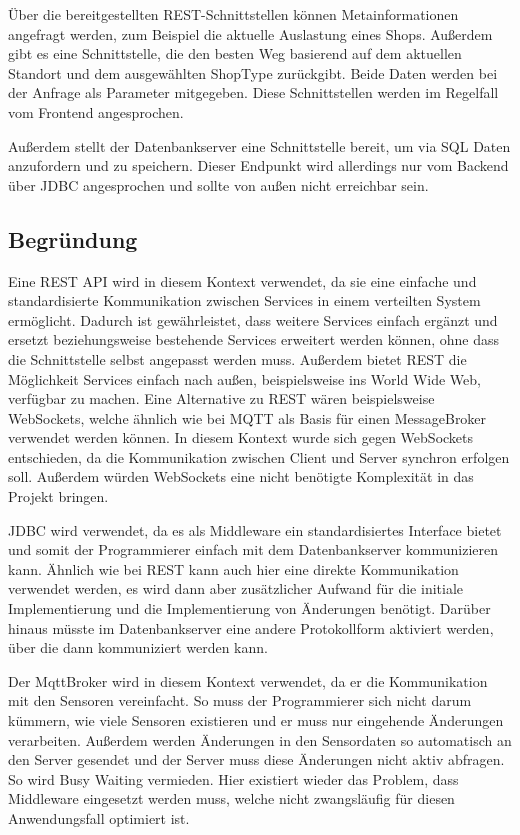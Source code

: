 \documentclass[runningheads]{llncs}
\begin{document}
Über die bereitgestellten REST-Schnittstellen können Metainformationen angefragt werden, zum Beispiel die aktuelle Auslastung eines Shops.
Außerdem gibt es eine Schnittstelle, die den besten Weg basierend auf dem aktuellen Standort und dem ausgewählten ShopType zurückgibt.
Beide Daten werden bei der Anfrage als Parameter mitgegeben.
Diese Schnittstellen werden im Regelfall vom Frontend angesprochen.

Außerdem stellt der Datenbankserver eine Schnittstelle bereit, um via SQL Daten anzufordern und zu speichern.
Dieser Endpunkt wird allerdings nur vom Backend über JDBC angesprochen und sollte von außen nicht erreichbar sein.

\subsection{Begründung}
Eine REST API wird in diesem Kontext verwendet, da sie eine einfache und standardisierte Kommunikation zwischen Services in einem verteilten System ermöglicht.
Dadurch ist gewährleistet, dass weitere Services einfach ergänzt und ersetzt beziehungsweise bestehende Services erweitert werden können, ohne dass die Schnittstelle selbst angepasst werden muss.
Außerdem bietet REST die Möglichkeit Services einfach nach außen, beispielsweise ins World Wide Web, verfügbar zu machen.
Eine Alternative zu REST wären beispielsweise WebSockets, welche ähnlich wie bei MQTT als Basis für einen MessageBroker verwendet werden können.
In diesem Kontext wurde sich gegen WebSockets entschieden, da die Kommunikation zwischen Client und Server synchron erfolgen soll.
Außerdem würden WebSockets eine nicht benötigte Komplexität in das Projekt bringen.

JDBC wird verwendet, da es als Middleware ein standardisiertes Interface bietet und somit der Programmierer einfach mit dem Datenbankserver kommunizieren kann.
Ähnlich wie bei REST kann auch hier eine direkte Kommunikation verwendet werden, es wird dann aber zusätzlicher Aufwand für die initiale Implementierung und die Implementierung von Änderungen benötigt.
Darüber hinaus müsste im Datenbankserver eine andere Protokollform aktiviert werden, über die dann kommuniziert werden kann.

Der MqttBroker wird in diesem Kontext verwendet, da er die Kommunikation mit den Sensoren vereinfacht.
So muss der Programmierer sich nicht darum kümmern, wie viele Sensoren existieren und er muss nur eingehende Änderungen verarbeiten.
Außerdem werden Änderungen in den Sensordaten so automatisch an den Server gesendet und der Server muss diese Änderungen nicht aktiv abfragen.
So wird Busy Waiting vermieden.
Hier existiert wieder das Problem, dass Middleware eingesetzt werden muss, welche nicht zwangsläufig für diesen Anwendungsfall optimiert ist.


\newpage


\end{document}
